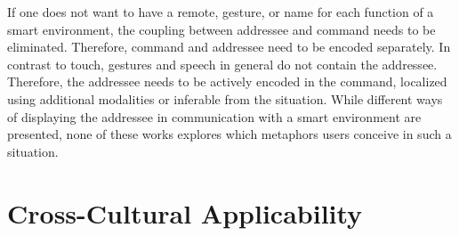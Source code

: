 If one does not want to have a remote, gesture, or name for each function of a \gls{smart environment}, the coupling between \gls{addressee} and command needs to be eliminated.
Therefore, command and \gls{addressee} need to be encoded separately.
In contrast to touch, gestures and speech in general do not contain the \gls{addressee}.
Therefore, the \gls{addressee} needs to be actively encoded in the command, localized using additional modalities or inferable from the situation.
While different ways of displaying the \gls{addressee} in communication with a \gls{smart environment} are presented, none of these works explores which metaphors \naive{} users conceive in such a situation.

\section{Cross-Cultural Applicability}\label{sec.rw.hi.limitations}

